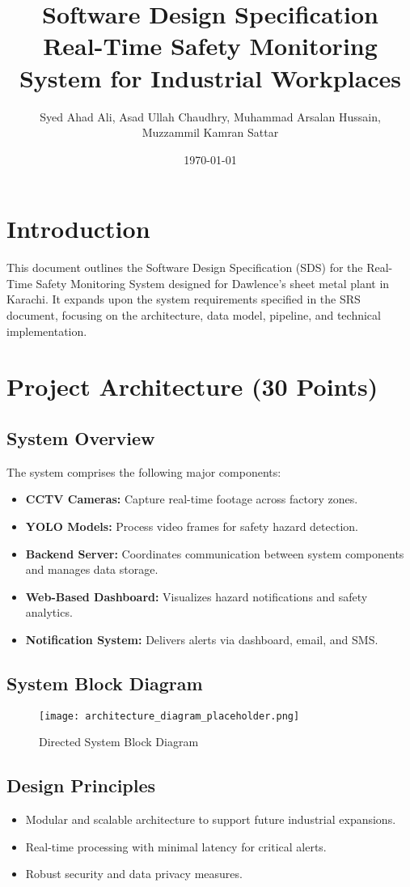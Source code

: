 \documentclass[12pt]{article}
\title{Software Design Specification \\ \large Real-Time Safety Monitoring System for Industrial Workplaces}
\author{Syed Ahad Ali, Asad Ullah Chaudhry, Muhammad Arsalan Hussain, \\ Muzzammil Kamran Sattar}
\date{\today}
\begin{document}
\maketitle
\tableofcontents
\newpage

\section{Introduction}
This document outlines the Software Design Specification (SDS) for the Real-Time Safety Monitoring System designed for Dawlence’s sheet metal plant in Karachi. It expands upon the system requirements specified in the SRS document, focusing on the architecture, data model, pipeline, and technical implementation.

\section{Project Architecture (30 Points)}
\subsection{System Overview}
The system comprises the following major components:
\begin{itemize}
    \item \textbf{CCTV Cameras:} Capture real-time footage across factory zones.
    \item \textbf{YOLO Models:} Process video frames for safety hazard detection.
    \item \textbf{Backend Server:} Coordinates communication between system components and manages data storage.
    \item \textbf{Web-Based Dashboard:} Visualizes hazard notifications and safety analytics.
    \item \textbf{Notification System:} Delivers alerts via dashboard, email, and SMS.
\end{itemize}

\subsection{System Block Diagram}
\begin{figure}[h]
    \centering
    \texttt{[image: architecture\_diagram\_placeholder.png]}
    \caption{Directed System Block Diagram}
    \label{fig:architecture}
\end{figure}

\subsection{Design Principles}
\begin{itemize}
    \item Modular and scalable architecture to support future industrial expansions.
    \item Real-time processing with minimal latency for critical alerts.
    \item Robust security and data privacy measures.
\end{itemize}
\end{document}
